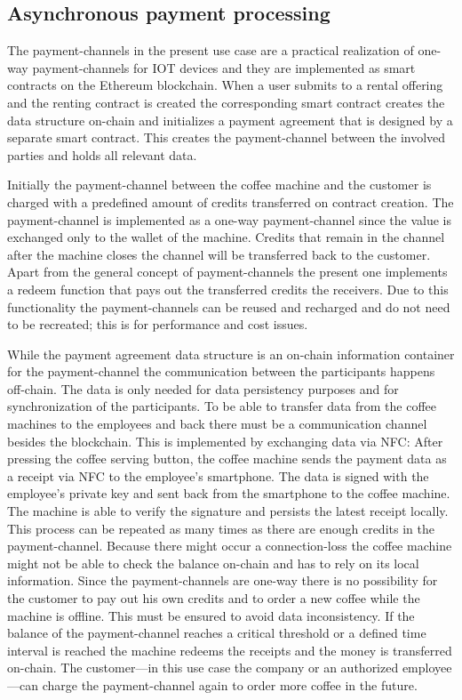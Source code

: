 \documentclass[conference]{IEEEtran}
\begin{document}
%
\subsection{Asynchronous payment processing}

The payment-channels in the present use case are a practical realization of one-way payment-channels for IOT devices and they are implemented as smart contracts on the Ethereum blockchain. When a user submits to a rental offering and the renting contract is created the corresponding smart contract creates the data structure on-chain and initializes a payment agreement that is designed by a separate smart contract. This creates the payment-channel between the involved parties and holds all relevant data.

Initially the payment-channel between the coffee machine and the customer is charged with a predefined amount of credits transferred on contract creation. The payment-channel is implemented as a one-way payment-channel since the value is exchanged only to the wallet of the machine. Credits that remain in the channel after the machine closes the channel will be transferred back to the customer. Apart from the general concept of payment-channels the present one implements a redeem function that pays out the transferred credits the receivers. Due to this functionality the payment-channels can be reused and recharged and do not need to be recreated; this is for performance and cost issues.

While the payment agreement data structure is an on-chain information container for the payment-channel the communication between the participants happens off-chain. The data is only needed for data persistency purposes and for synchronization of the participants. To be able to transfer data from the coffee machines to the employees and back there must be a communication channel besides the blockchain. This is implemented by exchanging data via NFC: After pressing the coffee serving button, the coffee machine sends the payment data as a receipt via NFC to the employee's smartphone. The data is signed with the employee's private key and sent back from the smartphone to the coffee machine. The machine is able to verify the signature and persists the latest receipt locally. This process can be repeated as many times as there are enough credits in the payment-channel. Because there might occur a connection-loss the coffee machine might not be able to check the balance on-chain and has to rely on its local information. Since the payment-channels are one-way there is no possibility for the customer to pay out his own credits and to order a new coffee while the machine is offline. This must be ensured to avoid data inconsistency. If the balance of the payment-channel reaches a critical threshold or a defined time interval is reached the machine redeems the receipts and the money is transferred on-chain. The customer---in this use case the company or an authorized employee---can charge the payment-channel again to order more coffee in the future.
\end{document}
